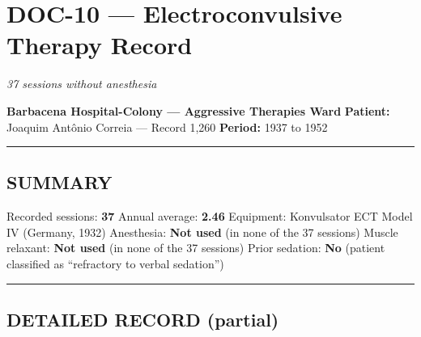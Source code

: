 \section*{\textbf{DOC-10} --- Electroconvulsive Therapy Record}

\noindent \textit{37 sessions without anesthesia}

\noindent \textbf{Barbacena Hospital-Colony --- Aggressive Therapies Ward}
\textbf{Patient:} Joaquim Antônio Correia --- Record 1,260
\textbf{Period:} 1937 to 1952

\vspace{0.5em}\noindent\rule{\textwidth}{0.5pt}\vspace{0.5em}

\subsection*{SUMMARY}

\noindent Recorded sessions: \textbf{37}
Annual average: \textbf{2.46}
Equipment: Konvulsator ECT Model IV (Germany, 1932)
Anesthesia: \textbf{Not used} (in none of the 37 sessions)
Muscle relaxant: \textbf{Not used} (in none of the 37 sessions)
Prior sedation: \textbf{No} (patient classified as \textquotedblleft{}refractory to verbal sedation\textquotedblright{})

\vspace{0.5em}\noindent\rule{\textwidth}{0.5pt}\vspace{0.5em}

\subsection*{DETAILED RECORD (partial)}

